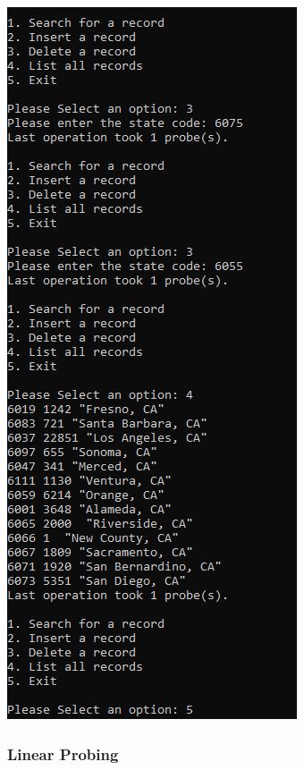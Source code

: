 \documentclass[titlepage]{article}
\begin{document}
\includegraphics[]{Small_Input/LF_0_25/ChainHash_3.png}   \newpage
\subsubsection{Linear Probing}
\end{document}
